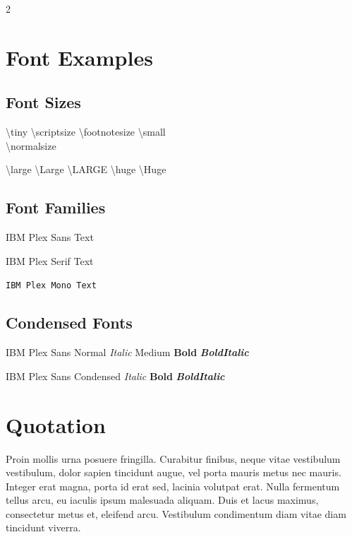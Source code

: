 \documentclass[
	a4paper, %
]{CSMakotoTechnicalReport}
\begin{document}
\begin{multicols}{2}
\section{Font Examples}

\subsection{Font Sizes}

{\tiny \textbackslash tiny} {\scriptsize \textbackslash scriptsize} {\footnotesize \textbackslash footnotesize} {\small \textbackslash small}\\
{\normalsize \textbackslash normalsize}\\
{\raggedright {\large \textbackslash large} {\Large \textbackslash Large} {\LARGE \textbackslash LARGE} {\huge \textbackslash huge} {\Huge \textbackslash Huge}\par}

\subsection{Font Families}

\textsf{IBM Plex Sans Text}

\textrm{IBM Plex Serif Text}

\texttt{IBM Plex Mono Text}

\subsection{Condensed Fonts}

IBM Plex Sans Normal \textit{Italic} {\plexsansmedium Medium} \textbf{Bold} \textit{\textbf{BoldItalic}}

{\plexsanscondensed IBM Plex Sans Condensed \textit{Italic} \textbf{Bold} \textit{\textbf{BoldItalic}}}


\section{Quotation}

Proin mollis urna posuere fringilla. Curabitur finibus, neque vitae vestibulum vestibulum, dolor sapien tincidunt augue, vel porta mauris metus nec mauris. Integer erat magna, porta id erat sed, lacinia volutpat erat. Nulla fermentum tellus arcu, eu iaculis ipsum malesuada aliquam. Duis et lacus maximus, consectetur metus et, eleifend arcu. Vestibulum condimentum diam vitae diam tincidunt viverra.


\end{multicols}
\end{document}
